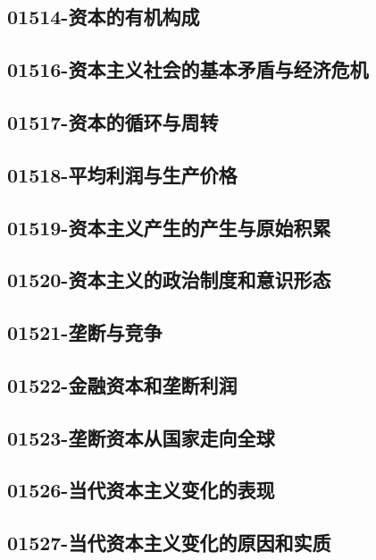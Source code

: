 \subsection{01514-资本的有机构成}

\subsection{01516-资本主义社会的基本矛盾与经济危机}

\subsection{01517-资本的循环与周转}

\subsection{01518-平均利润与生产价格}

\subsection{01519-资本主义产生的产生与原始积累}

\subsection{01520-资本主义的政治制度和意识形态}

\subsection{01521-垄断与竞争}

\subsection{01522-金融资本和垄断利润}

\subsection{01523-垄断资本从国家走向全球}

\subsection{01526-当代资本主义变化的表现}

\subsection{01527-当代资本主义变化的原因和实质}


